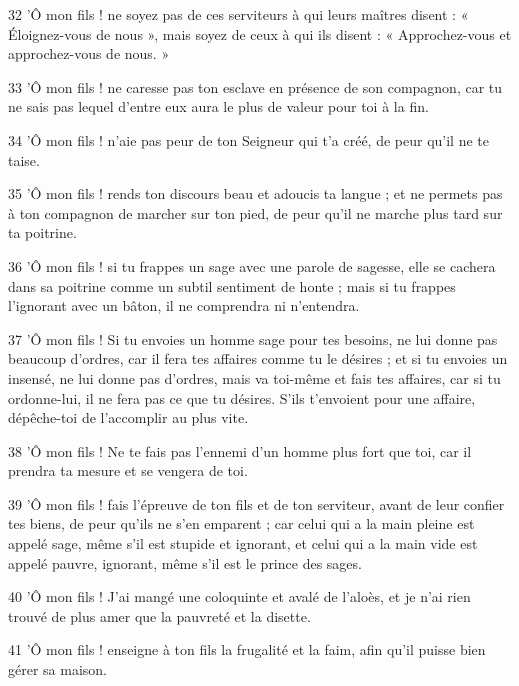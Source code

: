 \par 32 'Ô mon fils ! ne soyez pas de ces serviteurs à qui leurs maîtres disent : « Éloignez-vous de nous », mais soyez de ceux à qui ils disent : « Approchez-vous et approchez-vous de nous. »

\par 33 'Ô mon fils ! ne caresse pas ton esclave en présence de son compagnon, car tu ne sais pas lequel d'entre eux aura le plus de valeur pour toi à la fin.

\par 34 'Ô mon fils ! n'aie pas peur de ton Seigneur qui t'a créé, de peur qu'il ne te taise.

\par 35 'Ô mon fils ! rends ton discours beau et adoucis ta langue ; et ne permets pas à ton compagnon de marcher sur ton pied, de peur qu'il ne marche plus tard sur ta poitrine.

\par 36 'Ô mon fils ! si tu frappes un sage avec une parole de sagesse, elle se cachera dans sa poitrine comme un subtil sentiment de honte ; mais si tu frappes l'ignorant avec un bâton, il ne comprendra ni n'entendra.

\par 37 'Ô mon fils ! Si tu envoies un homme sage pour tes besoins, ne lui donne pas beaucoup d'ordres, car il fera tes affaires comme tu le désires ; et si tu envoies un insensé, ne lui donne pas d'ordres, mais va toi-même et fais tes affaires, car si tu ordonne-lui, il ne fera pas ce que tu désires. S'ils t'envoient pour une affaire, dépêche-toi de l'accomplir au plus vite.

\par 38 'Ô mon fils ! Ne te fais pas l'ennemi d'un homme plus fort que toi, car il prendra ta mesure et se vengera de toi.

\par 39 'Ô mon fils ! fais l'épreuve de ton fils et de ton serviteur, avant de leur confier tes biens, de peur qu'ils ne s'en emparent ; car celui qui a la main pleine est appelé sage, même s'il est stupide et ignorant, et celui qui a la main vide est appelé pauvre, ignorant, même s'il est le prince des sages.

\par 40 'Ô mon fils ! J'ai mangé une coloquinte et avalé de l'aloès, et je n'ai rien trouvé de plus amer que la pauvreté et la disette.

\par 41 'Ô mon fils ! enseigne à ton fils la frugalité et la faim, afin qu'il puisse bien gérer sa maison.

